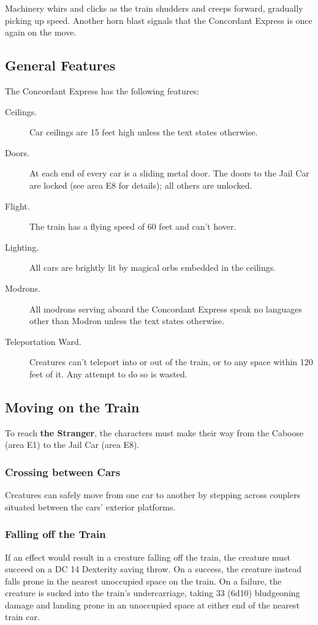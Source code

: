\documentclass[10pt,a4paper,twoside,bg=print,twocolumn,openany,nodeprecatedcode]{dndarticle}
\begin{document}
\begin{DndReadAloud}{}
Machinery whirs and clicks as the train shudders and creeps forward, gradually picking up speed. Another horn blast signals that the Concordant Express is once again on the move.

\end{DndReadAloud}

\subsection{General Features}
The Concordant Express has the following features:


\begin{description}
\item[Ceilings.]
Car ceilings are 15 feet high unless the text states otherwise.
\item[Doors.]
At each end of every car is a sliding metal door. The doors to the Jail Car are locked (see area E8 for details); all others are unlocked.
\item[Flight.]
The train has a flying speed of 60 feet and can't hover.
\item[Lighting.]
All cars are brightly lit by magical orbs embedded in the ceilings.
\item[Modrons.]
All modrons serving aboard the Concordant Express speak no languages other than Modron unless the text states otherwise.
\item[Teleportation Ward.]
Creatures can't teleport into or out of the train, or to any space within 120 feet of it. Any attempt to do so is wasted.
\end{description}

\subsection{Moving on the Train}
To reach \textbf{the Stranger}, the characters must make their way from the Caboose (area E1) to the Jail Car (area E8).

\subsubsection{Crossing between Cars}
Creatures can safely move from one car to another by stepping across couplers situated between the cars' exterior platforms.

\subsubsection{Falling off the Train}
If an effect would result in a creature falling off the train, the creature must succeed on a DC 14 Dexterity saving throw. On a success, the creature instead falls prone in the nearest unoccupied space on the train. On a failure, the creature is sucked into the train's undercarriage, taking 33 (6d10) bludgeoning damage and landing prone in an unoccupied space at either end of the nearest train car.
\end{document}
